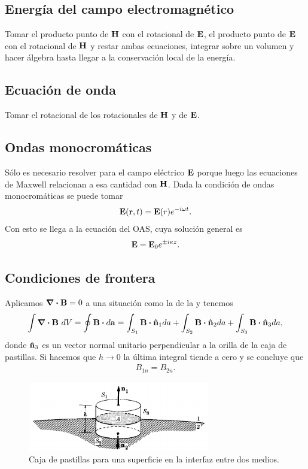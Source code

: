 \subsection{Energía del campo electromagnético}
Tomar el producto punto de $\vb{H}$ con el rotacional de $\vb{E}$,
el producto punto de $\vb{E}$ con el rotacional de $\vb{H}$ y 
restar ambas ecuaciones, integrar sobre un volumen y hacer álgebra 
hasta llegar a la conservación local de la energía.

\subsection{Ecuación de onda}
Tomar el rotacional de los rotacionales de $\vb{H}$ y de $\vb{E}$. 

\subsection{Ondas monocromáticas}
Sólo es necesario resolver para el campo eléctrico $\vb{E}$ porque
luego las ecuaciones de Maxwell relacionan a esa cantidad con $\vb{H}$.
Dada la condición de ondas monocromáticas se puede tomar 
\begin{align}
\vb{E}(\vb{r},t)=\vb{E}(r)e^{-i\omega t}.
\end{align}
Con esto se llega a la ecuación del OAS, cuya solución general es 
\begin{align}
\vb{E}=\vb{E}_0e^{\pm i\kappa z}.
\end{align}

\subsection{Condiciones de frontera}
Aplicamos $\div{\vb{B}}=0$ a una situación como la de la 
 y tenemos 
\begin{align}
\int \div{\vb{B}}\ dV = \oint \vb{B}\vdot d\vb{a}=
\int _{S_1}\vb{B}\vdot \uv{n}_1 da +
\int _{S_2}\vb{B}\vdot \uv{n}_2 da + 
\int _{S_3}\vb{B}\vdot \uv{n}_3 da ,
\end{align}
donde $\boldsymbol{\hat{\mathrm{n}}}_3$ es un vector normal unitario perpendicular a 
la orilla de la caja de pastillas. Si hacemos que $h\to 0$ la última 
integral tiende a cero y se concluye que 
\begin{align}
B_{1n} = B_{2n}.
\end{align}
\begin{figure}
  \centering
  \includegraphics[width=8cm]{images/boundary-cond-B.png}
  \caption{Caja de pastillas para una superficie en la interfaz entre dos 
  medios.}
  \label{fig:boundary-cond-B}
\end{figure}

